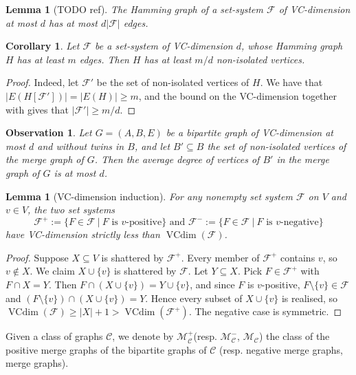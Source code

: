 \documentclass[11pt]{article}
\newtheorem{corollary}[theorem]{Corollary}
\newtheorem{lemma}[theorem]{Lemma}
\newtheorem{observation}[theorem]{Observation}
\theoremstyle{definition}
\newcommand{\CC}{{\mathscr C}}
\renewcommand{\ge}{\geqslant}
\newcommand{\set}[1]{\{#1\}}
\renewcommand{\cal}{\mathcal}
\DeclareMathOperator{\VCdim}{VCdim}
\newcommand{\remph}[1]{{\color{red} \emph{#1}}}
\begin{document}
\begin{lemma}[TODO ref]\label{lem:VC-dim2deg}
The Hamming graph of a set-system $\cal F$ of VC-dimension at most $d$ has at most $d |\cal F|$ edges.  
\end{lemma}

\begin{corollary}\label{cor:hamming}
Let $\cal F$ be a set-system of VC-dimension $d$, whose Hamming graph $H$ has at least $m$ edges. Then $H$ has at least $m/d$ non-isolated vertices.
\end{corollary}
\begin{proof}
Indeed, let $\cal F'$ be the set of non-isolated vertices of $H$. We have that $|E(H[\cal F'])| = |E(H)| \ge m$, and the bound on the VC-dimension together with  gives that $|\cal F'| \ge m / d$.
\end{proof}

\begin{observation}\label{obs:merge-graph-density}
Let $G = (A, B, E)$ be a bipartite graph of VC-dimension at most $d$ and without twins in $B$, and let $B' \subseteq B$ the set of non-isolated vertices of the merge graph of $G$.
Then the average degree of vertices of $B'$ in the merge graph of $G$ is at most $d$.
\end{observation}

\begin{lemma}[VC-dimension induction]\label{lem:VC-induction-dabe}
For any nonempty set system $\cal F$ on $V$ and $v\in V$, the two set systems
\[
\cal F^+ := \{F \in \cal F ~|~F \text{ is $v$-positive}\} \text{ and } \cal F^- := \{F \in \cal F ~|~F \text{ is $v$-negative}\}
\]
have VC-dimension strictly less than $\VCdim(\cal F)$.
\end{lemma}
\begin{proof}
Suppose $X \subseteq V$ is shattered by $\cal F^+$. Every member of $\cal F^+$
contains $v$, so $v \notin X$. We claim $X \cup \{v\}$ is shattered by $\cal F$.
Let $Y \subseteq X$. Pick $F \in \cal F^+$ with $F \cap X = Y$. Then
$F \cap (X \cup \set{v}) = Y \cup \set{v}$, and since $F$ is $v$-positive,
$F \setminus \set{v} \in \cal F$ and
$(F \setminus \set v) \cap (X \cup \set v) = Y$. Hence every subset of
$X \cup \set v$ is realised, so
$\VCdim(\cal F) \ge |X| + 1 > \VCdim(\cal F^+)$. The negative case is symmetric.
\end{proof}

Given a class of graphs $\CC$, we denote by \remph{$\cal M^+_{\CC}$}(resp. \remph{$\cal M^-_{\CC}$}, \remph{$\cal M_{\CC}$}) the class of the positive merge graphs of the bipartite graphs of $\CC$ (resp. negative merge graphs, merge graphs).
\end{document}
